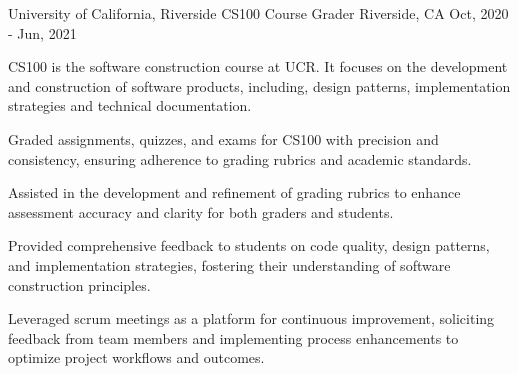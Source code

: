 \cventry
{University of California, Riverside} %
{CS100 Course Grader} %
{Riverside, CA}
{Oct, 2020 - Jun, 2021}
{
	CS100 is the software construction course at UCR. It focuses on the development and construction of software products, including, design patterns, implementation strategies and technical documentation.
	\begin{cvitemsdesc} %
		\item {Graded assignments, quizzes, and exams for CS100 with precision and consistency, ensuring adherence to grading rubrics and academic standards.}
		\item {Assisted in the development and refinement of grading rubrics to enhance assessment accuracy and clarity for both graders and students.}
		\item {Provided comprehensive feedback to students on code quality, design patterns, and implementation strategies, fostering their understanding of software construction principles.}
		\item{Leveraged scrum meetings as a platform for continuous improvement, soliciting feedback from team members and implementing process enhancements to optimize project workflows and outcomes.}
	\end{cvitemsdesc}
}

